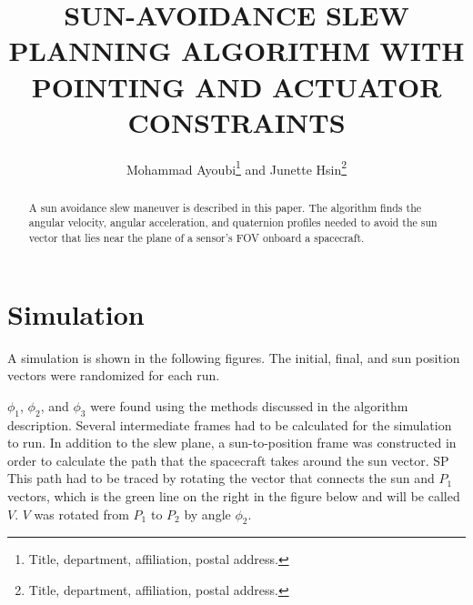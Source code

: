 \documentclass[letterpaper, preprint, paper,11pt]{AAS}	%
\begin{document}
	
	\title{SUN-AVOIDANCE SLEW PLANNING ALGORITHM WITH POINTING AND ACTUATOR CONSTRAINTS}
	
	\author{
		Mohammad Ayoubi\thanks{Title, department, affiliation, postal address.} and Junette Hsin\thanks{Title, department, affiliation, postal address.}
	}
	
	
	\maketitle{} 		
	
	
	\begin{abstract}
		
		A sun avoidance slew maneuver is described in this paper. The algorithm finds the angular velocity, angular acceleration, and quaternion profiles needed to avoid the sun vector that lies near the plane of a sensor's FOV onboard a spacecraft. 
		
		
	\end{abstract}
	
	\section{Simulation}
				
		A simulation is shown in the following figures. The initial, final, and sun position vectors were randomized for each run. 
		
		$\phi_1$, $\phi_2$, and $\phi_3$ were found using the methods discussed in the algorithm description. Several intermediate frames had to be calculated for the simulation to run. In addition to the slew plane, a sun-to-position frame was constructed in order to calculate the path that the spacecraft takes around the sun vector. SP This path had to be traced by rotating the vector that connects the sun and $P_1$ vectors, which is the green line on the right in the figure below and will be called $V$. $V$ was rotated from $P_1$ to $P_2$ by angle $\phi_2$. 
		
\end{document}
